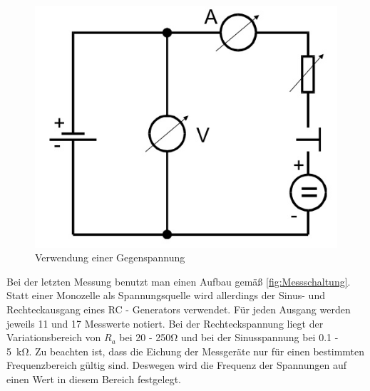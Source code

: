 \begin{figure}
\center
\includegraphics[scale=0.3]{Aufbau_c.jpg}
\caption{Verwendung einer Gegenspannung}
\label{fig:Messschaltung2}
\end{figure}

Bei der letzten Messung benutzt man einen Aufbau gemäß \ref{fig:Messschaltung}.
Statt einer Monozelle als Spannungsquelle wird allerdings der Sinus- und 
Rechteckausgang eines RC - Generators verwendet. 
Für jeden Ausgang werden jeweils 11 und 17 Messwerte notiert. Bei der 
Rechteckspannung liegt der Variationsbereich von $R_a$ bei 20 - 250\si{\ohm} 
und bei der Sinusspannung bei 0.1 - \SI{5}{\kilo\ohm}.
Zu beachten ist, dass die Eichung der Messgeräte nur für einen bestimmten 
Frequenzbereich gültig sind. Deswegen wird die Frequenz der Spannungen auf
einen Wert in diesem Bereich festgelegt.

\label{sec:Durchführung}
